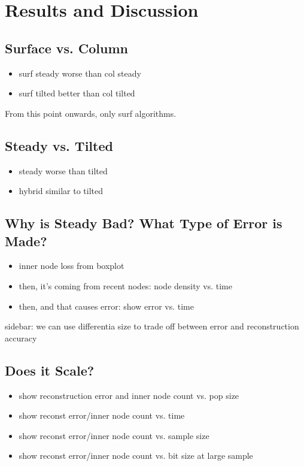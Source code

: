 \section{Results and Discussion} \label{sec:results}

\subsection{Surface vs. Column} \label{sec:surface-vs-column}
\begin{itemize}
    \item surf steady worse than col steady
    \item surf tilted better than col tilted
\end{itemize}

From this point onwards, only surf algorithms.

\subsection{Steady vs. Tilted} \label{sec:steady-vs-tilted}
\begin{itemize}
    \item steady worse than tilted
    \item hybrid similar to tilted
\end{itemize}

\subsection{Why is Steady Bad? What Type of Error is Made?} \label{sec:error-analysis}
\begin{itemize}
    \item inner node loss from boxplot
    \item then, it's coming from recent nodes: node density vs. time
    \item then, and that causes error: show error vs. time
\end{itemize}

sidebar: we can use differentia size to trade off between error and reconstruction accuracy

\subsection{Does it Scale?} \label{sec:scaling}
\begin{itemize}
    \item show reconstruction error and inner node count vs. pop size
    \item show reconst error/inner node count vs. time
    \item show reconst error/inner node count vs. sample size
    \item show reconst error/inner node count vs. bit size at large sample
\end{itemize}
